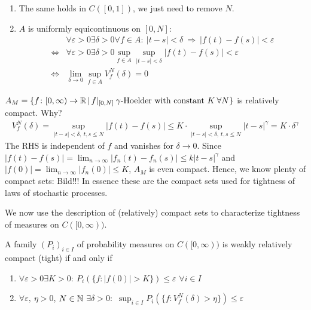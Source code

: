\begin{bem1}
	\begin{enumerate}[label=(\roman*)]
		\item The same holds in $C([0,1])$, we just need to remove $N$.
		\item $A$ is uniformly equicontinuous on $[0,N]$:
			\begin{align*}
				&\forall \varepsilon > 0 \exists \delta > 0\forall f \in A \colon \: \lvert t-s \rvert < \delta \: \Rightarrow \: \lvert f(t) - f(s) \rvert < \varepsilon \\
				\Leftrightarrow &\forall \varepsilon > 0 \exists \delta > 0 \sup_{f\in A} \sup_{\lvert t-s \rvert < \delta} \lvert f(t) - f(s) \rvert < \varepsilon \\
				\Leftrightarrow &\lim_{\delta \to 0} \sup_{f\in A} V_f^N(\delta) = 0
			\end{align*}
	\end{enumerate}
\end{bem1}
\begin{example1}
	$A_M = \{ f \colon [0,\infty) \to \mathbb{R} \,|\, f\arrowvert_{[0,N]}\: \gamma\text{-Hoelder with constant }K \:\forall N\}$ is relatively compact. Why?
	\begin{align*}
		V_f^N(\delta) = \sup_{\lvert t-s \rvert < \delta,\: t,s\leq N} \lvert f(t)- f(s) \rvert \leq K \cdot \sup_{\lvert t-s \rvert < \delta,\: t,s\leq N} \lvert t-s\rvert^{\gamma} = K \cdot \delta^{\gamma}
	\end{align*} 
	The RHS is independent of $f$ and vanishes for $\delta\to 0$.
	Since $\lvert f(t)-f(s)\rvert = \lim_{n\to\infty} \lvert f_n(t)-f_n(s) \rvert \leq k \lvert t-s \vert^{\gamma}$ and $\lvert f(0)\rvert = \lim_{n\to\infty} \lvert f_n(0)\rvert \leq K$, $A_M$ is even compact. Hence, we know plenty of compact sets: Bild!!! In essence these are the compact sets used for tightness of laws of stochastic processes.
\end{example1}
We now use the description of (relatively) compact sets to characterize tightness of measures on $C([0,\infty))$.
\begin{lsatz}
\begin{theorem}\label{sequence_tight}
	A family $(P_i)_{i\in I}$ of probability measures on $C([0,\infty))$ is weakly relatively compact (tight) if and only if
	\begin{enumerate}[label=(\roman*)]
		\item $\forall \varepsilon > 0 \exists K >0 \colon \: P_i \left( \{ f \colon \lvert f(0)\rvert >K\}\right)\leq \varepsilon$ $\forall i \in I$
		\item $\forall \varepsilon, \: \eta > 0$, $N\in\mathbb{N}$ $\exists \delta > 0 \colon$ $\sup_{i\in I} P_i \left( \{ f\colon V_f^N(\delta) > \eta\}\right) \leq \varepsilon$
	\end{enumerate}
\end{theorem}
\end{lsatz}
